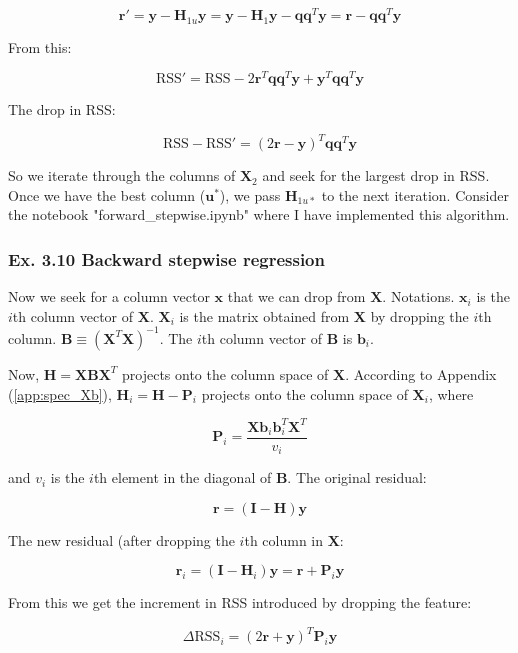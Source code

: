 \documentclass{article}
\begin{document}
\[
\mathbf{r}' = \mathbf{y} - \mathbf{H}_{1u}\mathbf{y} = \mathbf{y} - \mathbf{H}_1 \mathbf{y} - \mathbf{q}\mathbf{q}^T\mathbf{y} = \mathbf{r} - \mathbf{q}\mathbf{q}^T\mathbf{y}
\]

From this:

\[
\text{RSS}' = \text{RSS} -2\mathbf{r}^T \mathbf{q}\mathbf{q}^T \mathbf{y} + \mathbf{y}^T\mathbf{q}\mathbf{q}^T\mathbf{y}
\]

The drop in RSS:

\[
\text{RSS} - \text{RSS}' = (2\mathbf{r} - \mathbf{y})^T\mathbf{q}\mathbf{q}^T\mathbf{y}
\]

So we iterate through the columns of $\mathbf{X}_2$ and seek for the largest drop in RSS. Once we have the best column ($\mathbf{u}^{*}$), we pass $\mathbf{H}_{1u*}$ to the next iteration. Consider the notebook "forward\_stepwise.ipynb" where I have implemented this algorithm.

\subsubsection{Ex. 3.10 Backward stepwise regression}

Now we seek for a column vector $\mathbf{x}$ that we can drop from $\mathbf{X}$. Notations. $\mathbf{x}_i$ is the $i$th column vector of $\mathbf{X}$. $\mathbf{X}_i$ is the matrix obtained from $\mathbf{X}$ by dropping the $i$th column. $\mathbf{B} \equiv (\mathbf{X}^T\mathbf{X})^{-1}$. The $i$th column vector of $\mathbf{B}$ is $\mathbf{b}_i$.

Now, $\mathbf{H} = \mathbf{X}\mathbf{B}\mathbf{X}^T$ projects onto the column space of $\mathbf{X}$. According to Appendix (\ref{app:spec_Xb}), $\mathbf{H}_i = \mathbf{H} - \mathbf{P}_i$ projects onto the column space of $\mathbf{X}_i$, where

\[
\mathbf{P}_i = \frac{\mathbf{X}\mathbf{b}_i \mathbf{b}^T_i \mathbf{X}^T}{v_i}
\]

and $v_i$ is the $i$th element in the diagonal of $\mathbf{B}$. The original residual:

\[
\mathbf{r} = (\mathbf{I} - \mathbf{H})\mathbf{y}
\]

The new residual (after dropping the $i$th column in $\mathbf{X}$:

\[
\mathbf{r}_i = (\mathbf{I} - \mathbf{H}_i)\mathbf{y} = \mathbf{r} + \mathbf{P}_i \mathbf{y}
\]

From this we get the increment in RSS introduced by dropping the feature:

\[
\Delta \text{RSS}_i = (2\mathbf{r} + \mathbf{y})^T \mathbf{P}_i \mathbf{y}
\]
\end{document}
